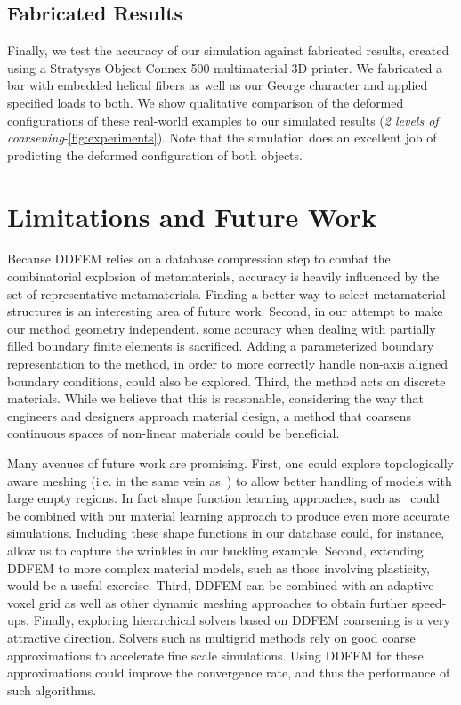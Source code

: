 \subsection{Fabricated Results}
Finally, we test the accuracy of our simulation against fabricated results, created using a Stratysys Object Connex 500 multimaterial 3D printer. We fabricated a bar with embedded helical fibers as well as our George character and applied specified loads to both. We show qualitative comparison of the deformed configurations of these real-world examples to our simulated results (\emph{2 levels of coarsening}-\autoref{fig:experiments}). Note that the simulation does an excellent job of predicting the deformed configuration of both objects.

\section{Limitations and Future Work}
Because DDFEM relies on a database compression step to combat the combinatorial explosion of metamaterials,  accuracy is heavily influenced by the set of representative metamaterials. Finding a better way to select metamaterial structures is an interesting area of future work.
Second, in our attempt to make our method geometry independent, some accuracy when dealing with partially filled boundary finite elements is sacrificed. Adding a parameterized boundary representation to the method, in order to more correctly handle non-axis aligned boundary conditions, could also be explored. Third, the method acts on discrete materials. While we believe that this is reasonable, considering the way that engineers and designers approach material design, a method that coarsens continuous spaces of non-linear materials could be beneficial.   

Many avenues of future work are promising. First, one could explore topologically aware meshing (i.e. in the same vein as~\citet{Nesme2009}) to allow better handling of models with large empty regions.
In fact shape function learning approaches, such as~\citet{Nesme2009} could be combined with our material learning approach to produce even more accurate simulations. Including these shape functions in our database could, for instance,  allow us to capture the wrinkles in our buckling example. Second, extending DDFEM to more complex material models, such as those involving plasticity, would be a useful exercise.
Third, DDFEM can be combined with an adaptive voxel grid as well as other dynamic meshing approaches to obtain further speed-ups.  Finally,  exploring hierarchical solvers based on DDFEM coarsening is a very attractive direction. Solvers such as multigrid methods rely on good coarse approximations to accelerate fine scale simulations. Using DDFEM for these approximations could improve the convergence rate, and thus the performance of such algorithms. 
